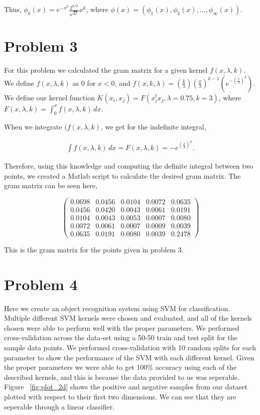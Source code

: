 \documentclass[paper=a4, fontsize=11pt]{scrartcl} %
\begin{document}
Thus, $\phi_k(x) = e^{-x^2}\frac{2^{k/2}}{\sqrt{k!}}x^k$, where $\phi(x) = (\phi_1(x),\phi_2(x),...,\phi_\infty(x))$.

\section{Problem 3}

For this problem we calculated the gram matrix for a given kernel $f(x,\lambda,k)$.
We define $f(x,\lambda,k)$ as $0$ for $x < 0$, and $f(x,k,\lambda)=(\frac{k}{\lambda})(\frac{x}{\lambda})^{k-1}(e^{-(\frac{x}{\lambda})^k})$.
We define our kernel function $K(x_i,x_j) = F(x_i^tx_j,\lambda=0.75,k=3)$, where $F(x,\lambda,k) =\int^x_0 f(x,\lambda,k)\,dx$. 

When we integrate $(f(x,\lambda,k)$, we get for the indefinite integral, 

\begin{align}
\int f(x,\lambda,k) \,dx = F(x,\lambda,k) = -e^{(\frac{x}{\lambda})^k}.
\end{align}

Therefore, using this knowledge and computing the definite integral between two points, we created a Matlab script to calculate the desired gram matrix.
The gram matrix can be seen here, 

\[ \left( \begin{array}{ccccc}
0.0698 & 0.0456 & 0.0104 & 0.0072 & 0.0635 \\
0.0456 & 0.0420 & 0.0043 & 0.0061 & 0.0191 \\
0.0104 & 0.0043 & 0.0053 & 0.0007 & 0.0080 \\
0.0072 & 0.0061 & 0.0007 & 0.0009 & 0.0039 \\
0.0635 & 0.0191 & 0.0080 & 0.0039 & 0.2478\end{array} \right)\] 

This is the gram matrix for the points given in problem 3.

\section{Problem 4}

Here we create an object recognition system using SVM for classification.
Multiple different SVM kernels were chosen and evaluated, and all of the kernels chosen were able to perform well with the proper parameters.  
We performed cross-validation across the data-set using a 50-50 train and test split for the sample data points.
We performed cross-validation with 10 random splits for each parameter to show the performance of the SVM with each different kernel.
Given the proper parameters we were able to get 100\% accuracy using each of the described kernels, and this is because the data provided to us was seperable.  
Figure ~\ref{fig:plot_2d} shows the positive and negative samples from our dataset plotted with respect to their first two dimensions.
We can see that they are seperable through a linear classifier.
\end{document}
